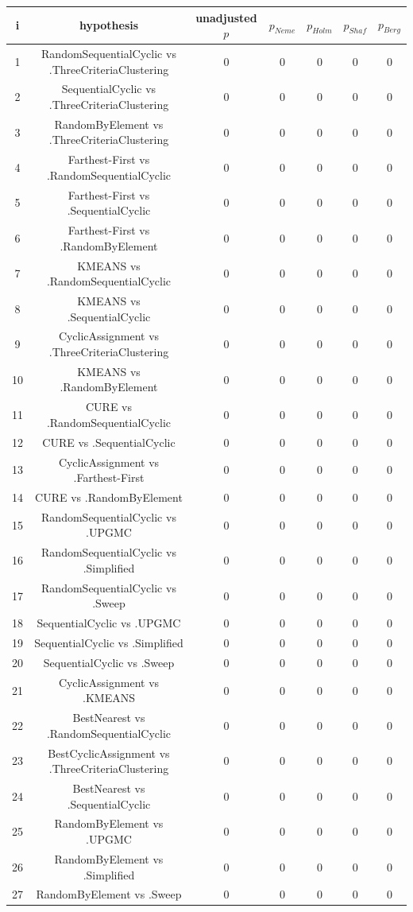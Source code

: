 \documentclass[a4paper,10pt]{article}
\begin{document}
\begin{landscape}
\begin{table}[!htp]
\centering\scriptsize
\begin{tabular}{ccccccc}
i&hypothesis&unadjusted $p$&$p_{Neme}$&$p_{Holm}$&$p_{Shaf}$&$p_{Berg}$\\
\hline1&RandomSequentialCyclic vs .ThreeCriteriaClustering&0&0&0&0&0\\
2&SequentialCyclic vs .ThreeCriteriaClustering&0&0&0&0&0\\
3&RandomByElement vs .ThreeCriteriaClustering&0&0&0&0&0\\
4&Farthest-First vs .RandomSequentialCyclic&0&0&0&0&0\\
5&Farthest-First vs .SequentialCyclic&0&0&0&0&0\\
6&Farthest-First vs .RandomByElement&0&0&0&0&0\\
7&KMEANS vs .RandomSequentialCyclic&0&0&0&0&0\\
8&KMEANS vs .SequentialCyclic&0&0&0&0&0\\
9&CyclicAssignment vs .ThreeCriteriaClustering&0&0&0&0&0\\
10&KMEANS vs .RandomByElement&0&0&0&0&0\\
11&CURE vs .RandomSequentialCyclic&0&0&0&0&0\\
12&CURE vs .SequentialCyclic&0&0&0&0&0\\
13&CyclicAssignment vs .Farthest-First&0&0&0&0&0\\
14&CURE vs .RandomByElement&0&0&0&0&0\\
15&RandomSequentialCyclic vs .UPGMC&0&0&0&0&0\\
16&RandomSequentialCyclic vs .Simplified&0&0&0&0&0\\
17&RandomSequentialCyclic vs .Sweep&0&0&0&0&0\\
18&SequentialCyclic vs .UPGMC&0&0&0&0&0\\
19&SequentialCyclic vs .Simplified&0&0&0&0&0\\
20&SequentialCyclic vs .Sweep&0&0&0&0&0\\
21&CyclicAssignment vs .KMEANS&0&0&0&0&0\\
22&BestNearest vs .RandomSequentialCyclic&0&0&0&0&0\\
23&BestCyclicAssignment vs .ThreeCriteriaClustering&0&0&0&0&0\\
24&BestNearest vs .SequentialCyclic&0&0&0&0&0\\
25&RandomByElement vs .UPGMC&0&0&0&0&0\\
26&RandomByElement vs .Simplified&0&0&0&0&0\\
27&RandomByElement vs .Sweep&0&0&0&0&0\\

\end{tabular}
\end{table}
\end{landscape}
\end{document}

